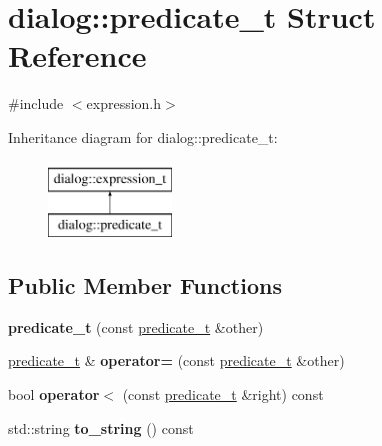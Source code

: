 \hypertarget{structdialog_1_1predicate__t}{}\section{dialog\+:\+:predicate\+\_\+t Struct Reference}
\label{structdialog_1_1predicate__t}


{\ttfamily \#include $<$expression.\+h$>$}

Inheritance diagram for dialog\+:\+:predicate\+\_\+t\+:\begin{figure}[H]
\begin{center}
\leavevmode
\includegraphics[height=2.000000cm]{structdialog_1_1predicate__t}
\end{center}
\end{figure}
\subsection*{Public Member Functions}
\begin{DoxyCompactItemize}
\item 
\mbox{\label{structdialog_1_1predicate__t_af2595b51d4041f0a03fa3db46a0bbcb5}} 
{\bfseries predicate\+\_\+t} (const \hyperlink{structdialog_1_1predicate__t}{predicate\+\_\+t} \&other)
\item 
\mbox{\label{structdialog_1_1predicate__t_a8fe17834ae8767c8aceebd8a4f5a92ac}} 
\hyperlink{structdialog_1_1predicate__t}{predicate\+\_\+t} \& {\bfseries operator=} (const \hyperlink{structdialog_1_1predicate__t}{predicate\+\_\+t} \&other)
\item 
\mbox{\label{structdialog_1_1predicate__t_ae8f4dd0d17d5ba98b3e8cf20daf14769}} 
bool {\bfseries operator$<$} (const \hyperlink{structdialog_1_1predicate__t}{predicate\+\_\+t} \&right) const
\item 
\mbox{\label{structdialog_1_1predicate__t_a20f7619369e0b3162a09940ef366a222}} 
std\+::string {\bfseries to\+\_\+string} () const
\end{DoxyCompactItemize}
